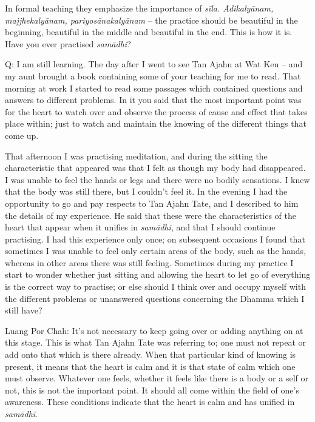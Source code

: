 In formal teaching they emphasize the importance of \emph{sīla. 
Ādikalyānam, majjhekalyānam, pariyosānakalyānam} -- the practice should
be beautiful in the beginning, beautiful in the middle and beautiful in
the end. This is how it is. Have you ever practised \emph{samādhi}? 

Q: I am still learning. The day after I went to see Tan Ajahn at Wat
Keu -- and my aunt brought a book containing some of your teaching for me
to read. That morning at work I started to read some passages which
contained questions and answers to different problems. In it you said
that the most important point was for the heart to watch over and
observe the process of cause and effect that takes place within; just to
watch and maintain the knowing of the different things that come up. 

That afternoon I was practising meditation, and during the sitting the
characteristic that appeared was that I felt as though my body had
disappeared. I was unable to feel the hands or legs and there were no
bodily sensations. I knew that the body was still there, but I couldn't
feel it. In the evening I had the opportunity to go and pay respects to
Tan Ajahn Tate, and I described to him the details of my experience. He
said that these were the characteristics of the heart that appear when
it unifies in \emph{samādhi}, and that I should continue practising. I
had this experience only once; on subsequent occasions I found that
sometimes I was unable to feel only certain areas of the body, such as
the hands, whereas in other areas there was still feeling. Sometimes
during my practice I start to wonder whether just sitting and allowing
the heart to let go of everything is the correct way to practise; or
else should I think over and occupy myself with the different problems
or unanswered questions concerning the Dhamma which I still have? 

Luang Por Chah: It's not necessary to keep going over or adding anything
on at this stage. This is what Tan Ajahn Tate was referring to; one must
not repeat or add onto that which is there already. When that particular
kind of knowing is present, it means that the heart is calm and it is
that state of calm which one must observe. Whatever one feels, whether
it feels like there is a body or a self or not, this is not the
important point. It should all come within the field of one's awareness. 
These conditions indicate that the heart is calm and has unified in
\emph{samādhi}. 

